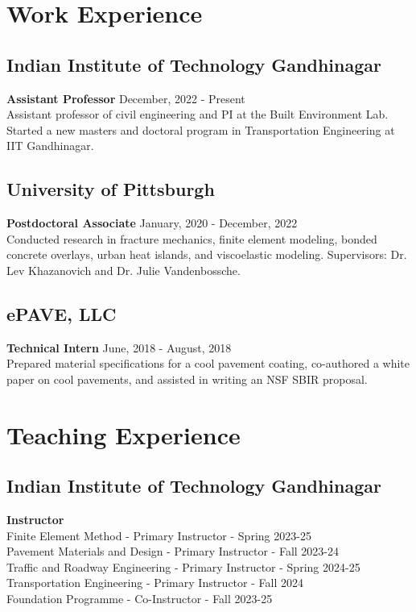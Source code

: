 \documentclass[12pt]{article}
\begin{document}
\bigskip
\section*{Work Experience}
\hfill
\subsection*{Indian Institute of Technology Gandhinagar}
\textbf{Assistant Professor} \hfill December, 2022 - Present \\
Assistant professor of civil engineering and PI at the Built Environment Lab. Started a new masters and doctoral program in Transportation Engineering at IIT Gandhinagar. \\

\subsection*{University of Pittsburgh}
\textbf{Postdoctoral Associate} \hfill January, 2020 - December, 2022 \\
Conducted research in fracture mechanics, finite element modeling, bonded concrete overlays, urban heat islands, and viscoelastic modeling. Supervisors: Dr. Lev Khazanovich and Dr. Julie Vandenbossche.\\

\subsection*{ePAVE, LLC}
\textbf{Technical Intern} \hfill June, 2018 - August, 2018 \\
Prepared material specifications for a cool pavement coating, co-authored a white paper on cool pavements, and assisted in writing an NSF SBIR proposal. 

\bigskip
\section*{Teaching Experience}
\hfill
\subsection*{Indian Institute of Technology Gandhinagar}
\textbf{Instructor}\\
Finite Element Method - Primary Instructor - Spring 2023-25 \\
Pavement Materials and Design - Primary Instructor - Fall 2023-24 \\
Traffic and Roadway Engineering - Primary Instructor - Spring 2024-25 \\
Transportation Engineering - Primary Instructor - Fall 2024 \\
Foundation Programme - Co-Instructor - Fall 2023-25
\end{document}
